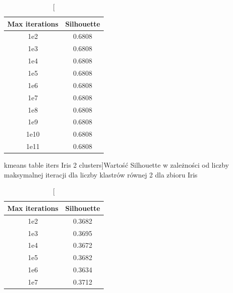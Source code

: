 \documentclass{classrep}
\begin{document}
{{%

            \begin{table}[!htbp]
                \begin{minipage}{.48\textwidth}
                    \centering
                    \begin{tabular}{|c|c|}
                        \hline
                        Max iterations & Silhouette \\ \hline
                        1e2 & 0.6808 \\ \hline
                        1e3 & 0.6808 \\ \hline
                        1e4 & 0.6808 \\ \hline
                        1e5 & 0.6808 \\ \hline
                        1e6 & 0.6808 \\ \hline
                        1e7 & 0.6808 \\ \hline
                        1e8 & 0.6808 \\ \hline
                        1e9 & 0.6808 \\ \hline
                        1e10 & 0.6808 \\ \hline
                        1e11 & 0.6808 \\ \hline
                    \end{tabular}
                    \caption
                    [kmeans table iters Iris 2 clusters]{Wartość Silhouette w
                    zależności od liczby maksymalnej iteracji dla liczby klastrów
                    równej 2 dla zbioru Iris}
                    \label{kmeans_table_iters_Iris_2_clusters}
                \end{minipage}
                \hfill
                \begin{minipage}{.48\textwidth}
                    \centering
                    \begin{tabular}{|c|c|}
                        \hline
                        Max iterations & Silhouette \\ \hline
                        1e2 & 0.3682 \\ \hline
                        1e3 & 0.3695 \\ \hline
                        1e4 & 0.3672 \\ \hline
                        1e5 & 0.3682 \\ \hline
                        1e6 & 0.3634 \\ \hline
                        1e7 & 0.3712 \\ \hline

\end{tabular}
\end{minipage}
\end{table}}}
\end{document}
